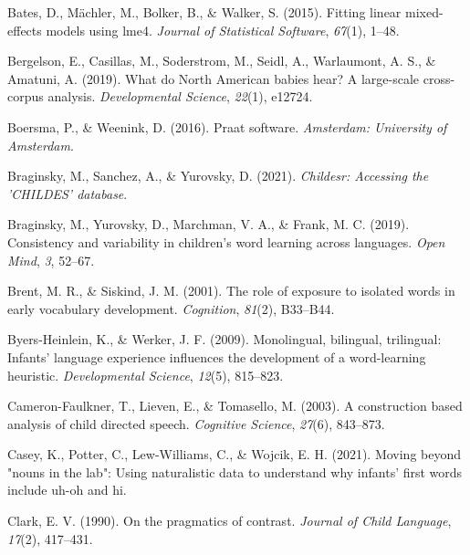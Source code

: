 \documentclass[10pt, letterpaper]{article}
\newenvironment{CSLReferences}%
  {}%
  {\par}
\begin{document}
\noindent

\hypertarget{refs}{}
\begin{CSLReferences}{1}{0}
\leavevmode\hypertarget{ref-bates2015fitting}{}%
Bates, D., Mächler, M., Bolker, B., \& Walker, S. (2015). Fitting linear
mixed-effects models using {lme4}. \emph{Journal of Statistical
Software}, \emph{67}(1), 1--48.

\leavevmode\hypertarget{ref-bergelson2019north}{}%
Bergelson, E., Casillas, M., Soderstrom, M., Seidl, A., Warlaumont, A.
S., \& Amatuni, A. (2019). What do {North American} babies hear? A
large-scale cross-corpus analysis. \emph{Developmental Science},
\emph{22}(1), e12724.

\leavevmode\hypertarget{ref-boersma2016praat}{}%
Boersma, P., \& Weenink, D. (2016). Praat software. \emph{Amsterdam:
University of Amsterdam}.

\leavevmode\hypertarget{ref-braginsky2021childesr}{}%
Braginsky, M., Sanchez, A., \& Yurovsky, D. (2021). \emph{Childesr:
Accessing the 'CHILDES' database}.

\leavevmode\hypertarget{ref-braginsky2019consistency}{}%
Braginsky, M., Yurovsky, D., Marchman, V. A., \& Frank, M. C. (2019).
Consistency and variability in children's word learning across
languages. \emph{Open Mind}, \emph{3}, 52--67.

\leavevmode\hypertarget{ref-brent2001role}{}%
Brent, M. R., \& Siskind, J. M. (2001). The role of exposure to isolated
words in early vocabulary development. \emph{Cognition}, \emph{81}(2),
B33--B44.

\leavevmode\hypertarget{ref-byers2009monolingual}{}%
Byers-Heinlein, K., \& Werker, J. F. (2009). Monolingual, bilingual,
trilingual: Infants' language experience influences the development of a
word-learning heuristic. \emph{Developmental Science}, \emph{12}(5),
815--823.

\leavevmode\hypertarget{ref-cameron2003construction}{}%
Cameron-Faulkner, T., Lieven, E., \& Tomasello, M. (2003). A
construction based analysis of child directed speech. \emph{Cognitive
Science}, \emph{27}(6), 843--873.

\leavevmode\hypertarget{ref-caseyURmoving}{}%
Casey, K., Potter, C., Lew-Williams, C., \& Wojcik, E. H. (2021). Moving
beyond "nouns in the lab": Using naturalistic data to understand why
infants' first words include uh-oh and hi.

\leavevmode\hypertarget{ref-clark1990pragmatics}{}%
Clark, E. V. (1990). On the pragmatics of contrast. \emph{Journal of
Child Language}, \emph{17}(2), 417--431.


\end{CSLReferences}
\end{document}
